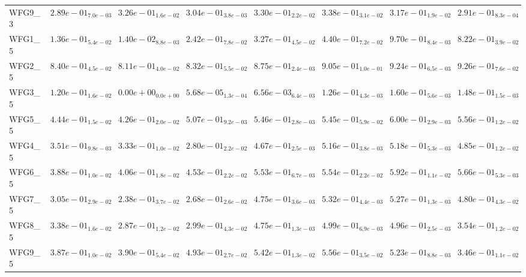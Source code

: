 \documentclass{article}
\begin{document}
\begin{landscape}
\begin{table}
\begin{scriptsize}
\begin{tabular}{llllllll}
WFG9\_3 & $  2.89e-01_{ 7.0e-03}$ & $  3.26e-01_{ 1.6e-02}$ & $  3.04e-01_{ 3.8e-03}$ & \cellcolor{gray25}$  3.30e-01_{ 2.2e-02}$ & \cellcolor{gray95}$  3.38e-01_{ 3.1e-02}$ & $  3.17e-01_{ 1.9e-02}$ & $  2.91e-01_{ 8.3e-04}$ \\
WFG1\_5 & $  1.36e-01_{ 5.4e-02}$ & $  1.40e-02_{ 8.8e-03}$ & $  2.42e-01_{ 7.8e-02}$ & $  3.27e-01_{ 4.5e-02}$ & $  4.40e-01_{ 7.2e-02}$ & \cellcolor{gray95}$  9.70e-01_{ 8.4e-03}$ & \cellcolor{gray25}$  8.22e-01_{ 3.9e-02}$ \\
WFG2\_5 & $  8.40e-01_{ 4.5e-02}$ & $  8.11e-01_{ 4.0e-02}$ & $  8.32e-01_{ 5.5e-02}$ & $  8.75e-01_{ 2.4e-03}$ & $  9.05e-01_{ 1.0e-01}$ & \cellcolor{gray25}$  9.24e-01_{ 6.5e-03}$ & \cellcolor{gray95}$  9.26e-01_{ 7.6e-02}$ \\
WFG3\_5 & $  1.20e-01_{ 1.6e-02}$ & $  0.00e+00_{ 0.0e+00}$ & $  5.68e-05_{ 1.3e-04}$ & $  6.56e-03_{ 6.4e-03}$ & $  1.26e-01_{ 4.3e-03}$ & \cellcolor{gray95}$  1.60e-01_{ 5.6e-03}$ & \cellcolor{gray25}$  1.48e-01_{ 1.5e-03}$ \\
WFG5\_5 & $  4.44e-01_{ 1.5e-02}$ & $  4.26e-01_{ 2.0e-02}$ & $  5.07e-01_{ 9.2e-03}$ & $  5.46e-01_{ 2.8e-03}$ & $  5.45e-01_{ 5.9e-02}$ & \cellcolor{gray95}$  6.00e-01_{ 2.9e-03}$ & \cellcolor{gray25}$  5.56e-01_{ 1.2e-02}$ \\
WFG4\_5 & $  3.51e-01_{ 9.8e-03}$ & $  3.33e-01_{ 1.0e-02}$ & $  2.80e-01_{ 2.2e-02}$ & $  4.67e-01_{ 2.5e-03}$ & \cellcolor{gray25}$  5.16e-01_{ 3.8e-03}$ & \cellcolor{gray95}$  5.18e-01_{ 5.3e-03}$ & $  4.85e-01_{ 1.2e-02}$ \\
WFG6\_5 & $  3.88e-01_{ 1.0e-02}$ & $  4.06e-01_{ 1.8e-02}$ & $  4.53e-01_{ 2.2e-02}$ & $  5.53e-01_{ 6.7e-03}$ & $  5.54e-01_{ 2.2e-02}$ & \cellcolor{gray95}$  5.92e-01_{ 1.1e-02}$ & \cellcolor{gray25}$  5.66e-01_{ 5.3e-03}$ \\
WFG7\_5 & $  3.05e-01_{ 2.9e-02}$ & $  2.38e-01_{ 3.7e-02}$ & $  2.68e-01_{ 2.6e-02}$ & $  4.75e-01_{ 3.6e-03}$ & \cellcolor{gray95}$  5.32e-01_{ 4.4e-03}$ & \cellcolor{gray25}$  5.27e-01_{ 1.3e-03}$ & $  4.80e-01_{ 4.3e-02}$ \\
WFG8\_5 & $  3.38e-01_{ 1.6e-02}$ & $  2.87e-01_{ 1.2e-02}$ & $  2.99e-01_{ 4.3e-02}$ & $  4.75e-01_{ 1.3e-03}$ & \cellcolor{gray95}$  4.99e-01_{ 6.9e-03}$ & \cellcolor{gray25}$  4.96e-01_{ 2.5e-03}$ & $  3.54e-01_{ 1.2e-02}$ \\
WFG9\_5 & $  3.87e-01_{ 1.0e-02}$ & $  3.90e-01_{ 5.4e-02}$ & $  4.93e-01_{ 2.7e-02}$ & \cellcolor{gray25}$  5.42e-01_{ 1.3e-02}$ & \cellcolor{gray95}$  5.56e-01_{ 3.5e-02}$ & $  5.23e-01_{ 8.8e-03}$ & $  3.46e-01_{ 1.1e-02}$ \\
\hline
\end{tabular}
\end{scriptsize}
\end{table}

\end{landscape}
\end{document}
